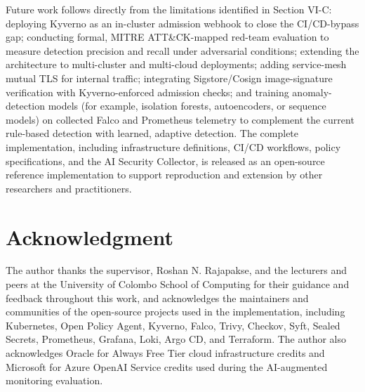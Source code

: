 \documentclass[conference]{IEEEtran}
\begin{document}
Future work follows directly from the limitations identified in Section VI-C: deploying Kyverno as an in-cluster admission webhook to close the CI/CD-bypass gap; conducting formal, MITRE ATT\&CK-mapped red-team evaluation to measure detection precision and recall under adversarial conditions; extending the architecture to multi-cluster and multi-cloud deployments; adding service-mesh mutual TLS for internal traffic; integrating Sigstore/Cosign image-signature verification with Kyverno-enforced admission checks; and training anomaly-detection models (for example, isolation forests, autoencoders, or sequence models) on collected Falco and Prometheus telemetry to complement the current rule-based detection with learned, adaptive detection. The complete implementation, including infrastructure definitions, CI/CD workflows, policy specifications, and the AI Security Collector, is released as an open-source reference implementation to support reproduction and extension by other researchers and practitioners.

\section*{Acknowledgment}
The author thanks the supervisor, Roshan N. Rajapakse, and the lecturers and peers at the University of Colombo School of Computing for their guidance and feedback throughout this work, and acknowledges the maintainers and communities of the open-source projects used in the implementation, including Kubernetes, Open Policy Agent, Kyverno, Falco, Trivy, Checkov, Syft, Sealed Secrets, Prometheus, Grafana, Loki, Argo CD, and Terraform. The author also acknowledges Oracle for Always Free Tier cloud infrastructure credits and Microsoft for Azure OpenAI Service credits used during the AI-augmented monitoring evaluation.
\end{document}
